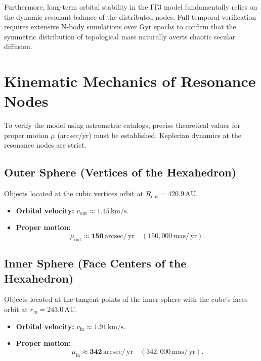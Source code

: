 \documentclass[11pt,a4paper]{article}
\theoremstyle{remark}
\newcommand{\AU}{\,\mathrm{AU}}
\newcommand{\mas}{\,\mathrm{mas}}
\newcommand{\yr}{\,\mathrm{yr}}
\newcommand{\arcsec}{\,\mathrm{arcsec}}
\begin{document}
Furthermore, long-term orbital stability in the IT3 model fundamentally relies on the dynamic resonant balance of the distributed nodes. Full temporal verification requires extensive N-body simulations over Gyr epochs to confirm that the symmetric distribution of topological mass naturally averts chaotic secular diffusion.

\section{Kinematic Mechanics of Resonance Nodes}

To verify the model using astrometric catalogs, precise theoretical values for proper motion $\mu$ (arcsec/yr) must be established. Keplerian dynamics at the resonance nodes are strict.

\subsection{Outer Sphere (Vertices of the Hexahedron)}

Objects located at the cubic vertices orbit at $R_{\text{out}} = 420.9\AU$.
\begin{itemize}[leftmargin=2em]
    \item \textbf{Orbital velocity:} $v_{\text{out}} \approx 1.45\,\mathrm{km/s}$.
    \item \textbf{Proper motion:} 
    \begin{equation}
        \mu_{\text{out}} \approx \mathbf{150\arcsec/\yr} \quad (150{,}000\mas/\yr).
        \label{eq:mu_out}
    \end{equation}
\end{itemize}

\subsection{Inner Sphere (Face Centers of the Hexahedron)}

Objects located at the tangent points of the inner sphere with the cube's faces orbit at $r_{\text{in}} = 243.0\AU$.
\begin{itemize}[leftmargin=2em]
    \item \textbf{Orbital velocity:} $v_{\text{in}} \approx 1.91\,\mathrm{km/s}$.
    \item \textbf{Proper motion:} 
    \begin{equation}
        \mu_{\text{in}} \approx \mathbf{342\arcsec/\yr} \quad (342{,}000\mas/\yr).
        \label{eq:mu_in}
    \end{equation}
\end{itemize}
\end{document}
